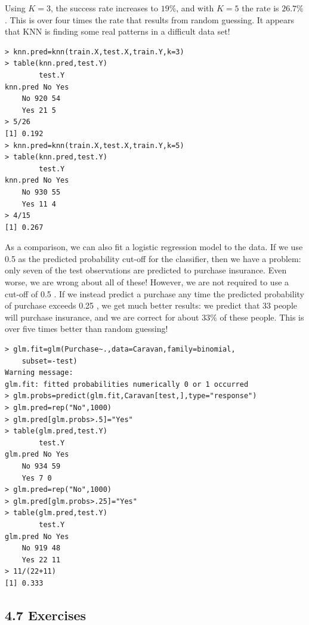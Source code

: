 \documentclass[10pt]{article}
\begin{document}
Using $K=3$, the success rate increases to $19 \%$, and with $K=5$ the rate is $26.7 \%$. This is over four times the rate that results from random guessing. It appears that KNN is finding some real patterns in a difficult data set!

\begin{verbatim}
> knn.pred=knn(train.X,test.X,train.Y,k=3)
> table(knn.pred,test.Y)
        test.Y
knn.pred No Yes
    No 920 54
    Yes 21 5
> 5/26
[1] 0.192
> knn.pred=knn(train.X,test.X,train.Y,k=5)
> table(knn.pred,test.Y)
        test.Y
knn.pred No Yes
    No 930 55
    Yes 11 4
> 4/15
[1] 0.267
\end{verbatim}

As a comparison, we can also fit a logistic regression model to the data. If we use 0.5 as the predicted probability cut-off for the classifier, then we have a problem: only seven of the test observations are predicted to purchase insurance. Even worse, we are wrong about all of these! However, we are not required to use a cut-off of 0.5 . If we instead predict a purchase any time the predicted probability of purchase exceeds 0.25 , we get much better results: we predict that 33 people will purchase insurance, and we are correct for about $33 \%$ of these people. This is over five times better than random guessing!

\begin{verbatim}
> glm.fit=glm(Purchase~.,data=Caravan,family=binomial,
    subset=-test)
Warning message:
glm.fit: fitted probabilities numerically 0 or 1 occurred
> glm.probs=predict(glm.fit,Caravan[test,],type="response")
> glm.pred=rep("No",1000)
> glm.pred[glm.probs>.5]="Yes"
> table(glm.pred,test.Y)
        test.Y
glm.pred No Yes
    No 934 59
    Yes 7 0
> glm.pred=rep("No",1000)
> glm.pred[glm.probs>.25]="Yes"
> table(glm.pred,test.Y)
        test.Y
glm.pred No Yes
    No 919 48
    Yes 22 11
> 11/(22+11)
[1] 0.333
\end{verbatim}

\subsection*{4.7 Exercises}
\end{document}
